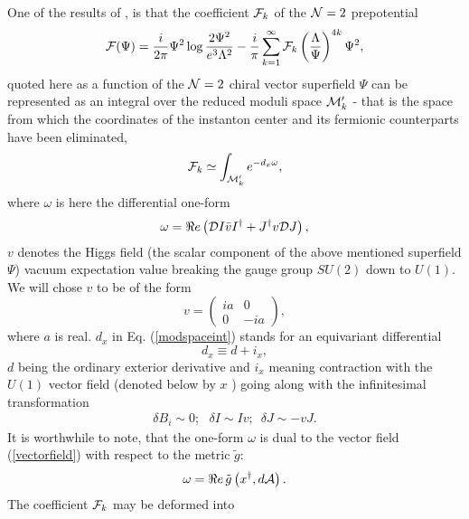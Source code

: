 \documentclass[a4paper,12pt]{article}
\begin{document}
One of the results of \cite{FPS1}, \cite{FPS2} is that the coefficient ${\cal F}_k$ of the ${\cal N}=2$
prepotential
\begin{equation}
{\cal F}(\Psi)=\frac{i}{2\pi} \Psi^2\log \frac{2\Psi^2}{e^3\Lambda^2} -\frac{i}{\pi}\sum_{k=1}^{\infty}{\cal
F}_k \left(\frac{\Lambda}{\Psi} \right)^{4k} \Psi^2, \label{Fexpansion}
\end{equation}
quoted here as a function of the ${\cal N}=2$ chiral vector superfield $\Psi$ can be represented as an integral
over the reduced moduli space $ {\cal M}'_k$ - that is the space from which the coordinates of the instanton
center and its fermionic counterparts have been eliminated,
\begin{equation}
{\cal F}_k \simeq \int_{{\cal M}'_k} e^{-d_x\omega}, \label{modspaceint}
\end{equation}
where $\omega$ is here the differential one-form
\begin{equation}
\omega=\Re e \left({\cal D}I \bar{v} I^{\dagger} +J^{\dagger} v
{\cal D}J \right), \label{omega}
\end{equation}
$v$ denotes the Higgs field (the scalar component of the above mentioned superfield $\Psi$) vacuum expectation
value breaking  the gauge group $SU(2)$ down to $U(1)$. We will chose $v$ to be of the form
\begin{equation}
v=\left(
\begin{array}{cc}
ia & 0 \\
0 & -ia \end{array}
\right),
\end{equation}
where $a$ is real.
 $d_x$ in Eq. (\ref{modspaceint}) stands for an
equivariant differential
\begin{equation}
d_x\equiv d+i_{x},
\end{equation}
$d$ being the ordinary exterior derivative and $i_x$ meaning contraction with the $U(1)$ vector field (denoted
below by $x$ ) going along with the infinitesimal transformation
\begin{eqnarray}
\delta B_i \sim 0; \, \, \, \, \delta I\sim Iv; \, \, \, \delta J\sim -vJ.
\label{vectorfield}
\end{eqnarray}
It is worthwhile to note, that the one-form $\omega$ is dual to
the vector field (\ref{vectorfield}) with respect to the metric
${\tilde g}$:
\begin{equation}
\omega =\Re e \,{\tilde g}\left(x^{\dagger}, d{\cal A} \right).
\label{omega'}
\end{equation}
The coefficient ${\cal F}_k$ may be deformed into
\end{document}
